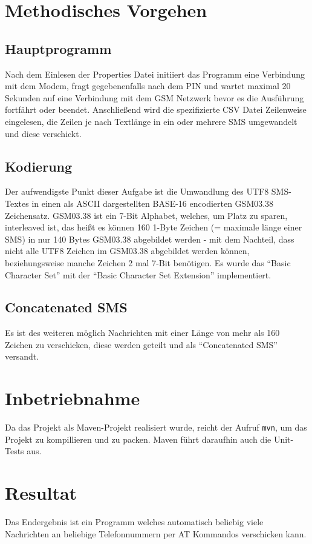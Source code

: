 \documentclass[paper=a4, fontsize=11pt]{scrartcl}
\begin{document}
\section{Methodisches Vorgehen}
\subsection{Hauptprogramm}
Nach dem Einlesen der Properties Datei initiiert das Programm eine Verbindung mit dem Modem, fragt gegebenenfalls nach dem PIN und wartet maximal 20 Sekunden auf eine Verbindung mit dem GSM Netzwerk bevor es die Ausführung fortfährt oder beendet. Anschließend wird die spezifizierte CSV Datei Zeilenweise eingelesen, die Zeilen je nach Textlänge in ein oder mehrere SMS umgewandelt und diese verschickt.

\subsection{Kodierung}
Der aufwendigste Punkt dieser Aufgabe ist die Umwandlung des UTF8 SMS-Textes in einen als ASCII dargestellten BASE-16 encodierten GSM03.38 Zeichensatz. GSM03.38 ist ein  7-Bit Alphabet, welches, um Platz zu sparen, interleaved ist, das heißt es können 160 1-Byte Zeichen (= maximale länge einer SMS) in nur 140 Bytes GSM03.38 abgebildet werden - mit dem Nachteil, dass nicht alle UTF8 Zeichen im GSM03.38 abgebildet werden können, beziehungsweise manche Zeichen 2 mal 7-Bit benötigen. Es wurde das \enquote{Basic Character Set} mit der \enquote{Basic Character Set Extension} implementiert. 

\subsection{Concatenated SMS}
Es ist des weiteren möglich Nachrichten mit einer Länge von mehr als 160 Zeichen zu verschicken, diese werden geteilt und als \enquote{Concatenated SMS} versandt.


\section{Inbetriebnahme}

Da das Projekt als Maven-Projekt realisiert wurde, reicht der Aufruf \texttt{mvn}, um das Projekt zu kompillieren und zu packen. Maven führt daraufhin auch die Unit-Tests aus.

\section{Resultat}
Das Endergebnis ist ein Programm welches automatisch beliebig viele Nachrichten an beliebige Telefonnummern per AT Kommandos verschicken kann.
\end{document}
